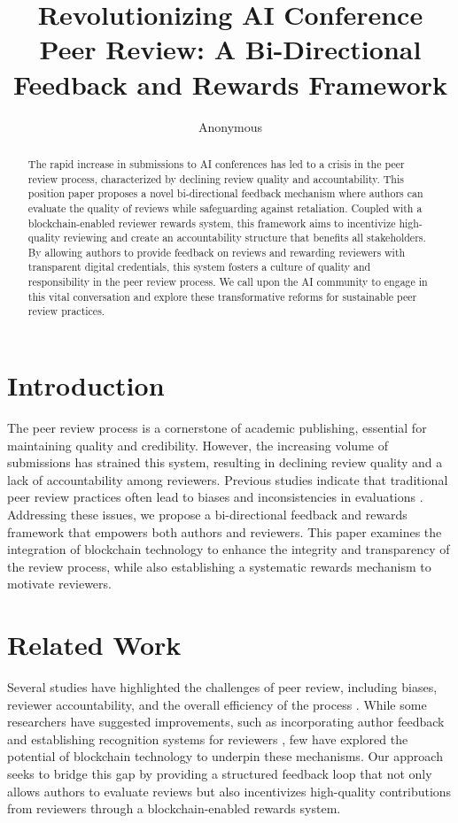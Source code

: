 \documentclass{article} %
\title{
Revolutionizing AI Conference Peer Review: A Bi-Directional Feedback and Rewards Framework
}
\author{Anonymous}
\theoremstyle{plain}
\theoremstyle{definition}
\theoremstyle{remark}
\begin{document}
\maketitle

\begin{abstract}
The rapid increase in submissions to AI conferences has led to a crisis in the peer review process, characterized by declining review quality and accountability. This position paper proposes a novel bi-directional feedback mechanism where authors can evaluate the quality of reviews while safeguarding against retaliation. Coupled with a blockchain-enabled reviewer rewards system, this framework aims to incentivize high-quality reviewing and create an accountability structure that benefits all stakeholders. By allowing authors to provide feedback on reviews and rewarding reviewers with transparent digital credentials, this system fosters a culture of quality and responsibility in the peer review process. We call upon the AI community to engage in this vital conversation and explore these transformative reforms for sustainable peer review practices.
\end{abstract}

\section{Introduction}
The peer review process is a cornerstone of academic publishing, essential for maintaining quality and credibility. However, the increasing volume of submissions has strained this system, resulting in declining review quality and a lack of accountability among reviewers. Previous studies indicate that traditional peer review practices often lead to biases and inconsistencies in evaluations \cite{peterson2024peerra, sahakyan2025disparitiesip}. Addressing these issues, we propose a bi-directional feedback and rewards framework that empowers both authors and reviewers. This paper examines the integration of blockchain technology to enhance the integrity and transparency of the review process, while also establishing a systematic rewards mechanism to motivate reviewers.

\section{Related Work}
Several studies have highlighted the challenges of peer review, including biases, reviewer accountability, and the overall efficiency of the process \cite{kim2025positionta, roumbanis2017academicju}. While some researchers have suggested improvements, such as incorporating author feedback and establishing recognition systems for reviewers \cite{jan2018recognitionar, shrestha2024acs}, few have explored the potential of blockchain technology to underpin these mechanisms. Our approach seeks to bridge this gap by providing a structured feedback loop that not only allows authors to evaluate reviews but also incentivizes high-quality contributions from reviewers through a blockchain-enabled rewards system.
\end{document}
